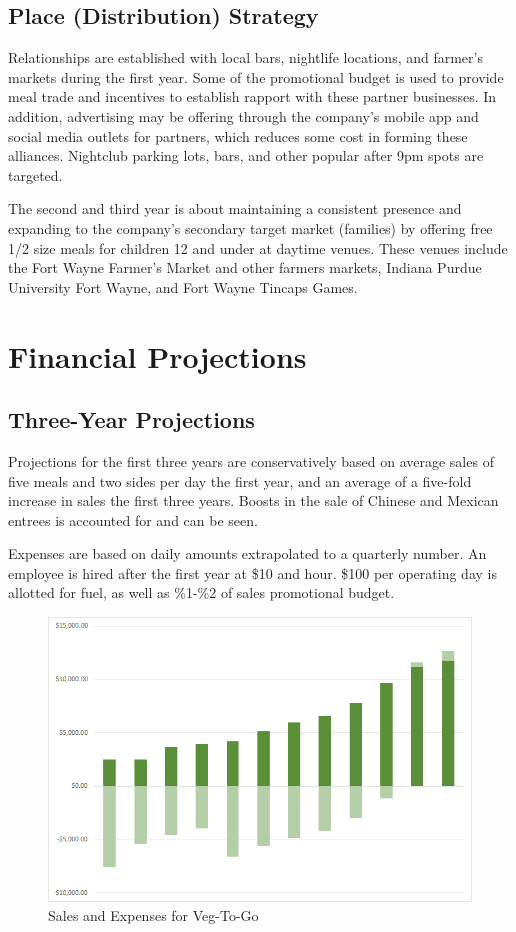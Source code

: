 \documentclass[12pt, letterpaper]{article}
\newcommand{\companyname}{Veg-To-Go}
\begin{document}
\subsection{Place (Distribution) Strategy}
Relationships are established with local bars, nightlife locations, and farmer's markets during the first year.  Some of the promotional budget is used to provide meal trade and incentives to establish rapport with these partner businesses.  In addition, advertising may be offering through the company's mobile app and social media outlets for partners, which reduces some cost in forming these alliances.  Nightclub parking lots, bars, and other popular after 9pm spots are targeted.

The second and third year is about maintaining a consistent presence and expanding to the company's secondary target market (families) by offering free 1/2 size meals for children 12 and under at daytime venues.  These venues include the Fort Wayne Farmer's Market and other farmers markets, Indiana Purdue University Fort Wayne, and Fort Wayne Tincaps Games.

\newpage

\section{Financial Projections}
\subsection{Three-Year Projections}

Projections for the first three years are conservatively based on average sales of five meals and two sides per day the first year, and an average of a five-fold increase in sales the first three years.  Boosts in the sale of Chinese and Mexican entrees is accounted for and can be seen.

Expenses are based on daily amounts extrapolated to a quarterly number. An employee is hired after the first year at \$10 and hour.  \$100 per operating day is allotted for fuel, as well as \%1-\%2 of sales promotional budget.

\begin{figure}[H]
	\caption{Sales and Expenses for \companyname{}}
	\includegraphics[width=\textwidth]{SalesAndExpenses}
\end{figure}
\end{document}
